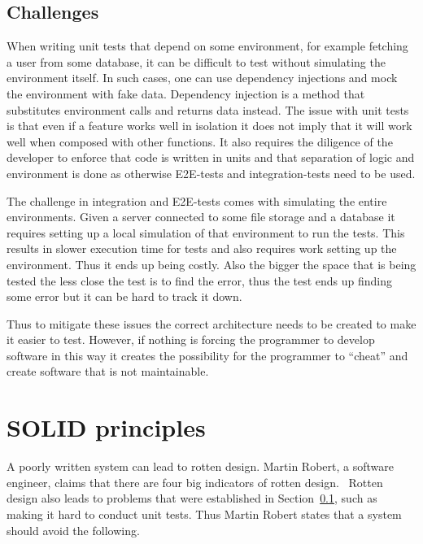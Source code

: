\subsection{Challenges}\label{challenges}

When writing unit tests that depend on some environment, for example fetching a
user from some database, it can be difficult to test without simulating the
environment itself. In such cases, one can use dependency injections and mock the
environment with fake data. Dependency injection is a method that substitutes
environment calls and returns data instead. The issue with unit tests is that
even if a feature works well in isolation it does not imply that it will work
well when composed with other functions. It also requires the diligence of the
developer to enforce that code is written in units and that separation of logic
and environment is done as otherwise E2E-tests and integration-tests need to be
used.

The challenge in integration and E2E-tests comes with simulating the entire
environments. Given a server connected to some file storage and a database it
requires setting up a local simulation of that environment to run the tests.
This results in slower execution time for tests and also requires work setting
up the environment. Thus it ends up being costly. Also the bigger the space
that is being tested the less close the test is to find the error,
thus the test ends up finding some error but it can be hard to track it down.

Thus to mitigate these issues the correct architecture needs to be created to
make it easier to test. However, if nothing is forcing the programmer to
develop software in this way it creates the possibility for the programmer to
``cheat'' and create software that is not maintainable. 

\section{SOLID principles}\label{oop}

A poorly written system can lead to rotten design. Martin Robert, a software
engineer, claims that there are four big indicators of rotten
design.~\cite{martinrobert} Rotten design also leads to problems that were
established in Section~\ref{challenges}, such as making it hard to conduct unit
tests. Thus Martin Robert states that a system should avoid the following.

